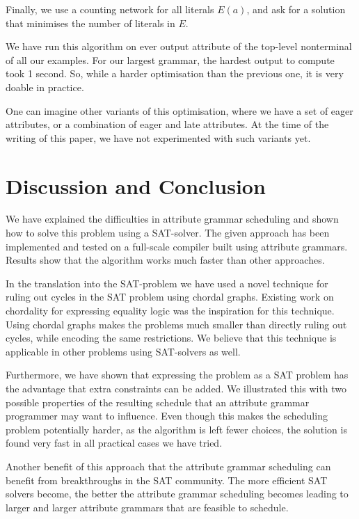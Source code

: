 \documentclass{llncs}
\begin{document}
Finally, we use a counting network for all literals $E(a)$, and ask for a solution that minimises the number of literals in $E$.

We have run this algorithm on ever output attribute of the top-level nonterminal of all our examples. For our largest grammar, the hardest output to compute took 1 second. So, while a harder optimisation than the previous one, it is very doable in practice.

One can imagine other variants of this optimisation, where we have a set of eager attributes, or a combination of eager and late attributes. At the time of the writing of this paper, we have not experimented with such variants yet.

\section{Discussion and Conclusion} \label{sect:conclusion}
We have explained the difficulties in attribute grammar scheduling and shown how to solve this problem using a SAT-solver. The given approach has been implemented and tested on a full-scale compiler built using attribute grammars. Results show that the algorithm works much faster than other approaches.

In the translation into the SAT-problem we have used a novel technique for ruling out cycles in the SAT problem using chordal graphs. Existing work on chordality for expressing equality logic \cite{bryant-chordal} was the inspiration for this technique. Using chordal graphs makes the problems much smaller than directly ruling out cycles, while encoding the same restrictions. We believe that this technique is applicable in other problems using SAT-solvers as well.

Furthermore, we have shown that expressing the problem as a SAT problem has the advantage that extra constraints can be added. We illustrated this with two possible properties of the resulting schedule that an attribute grammar programmer may want to influence. Even though this makes the scheduling problem potentially harder, as the algorithm is left fewer choices, the solution is found very fast in all practical cases we have tried.

Another benefit of this approach that the attribute grammar scheduling can benefit from breakthroughs in the SAT community. The more efficient SAT solvers become, the better the attribute grammar scheduling becomes leading to larger and larger attribute grammars that are feasible to schedule.
\end{document}
